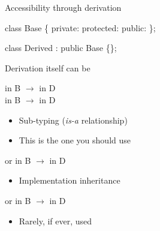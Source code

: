 \begin{frame}[fragile]{Accessibility through derivation}

  \begin{codeblock}{
class Base \{
 private:
  \ddd
 protected:
  \ddd
 public:
  \ddd
\};

class Derived : \alert{public} Base \{\};
}\end{codeblock}

  Derivation itself can be
  \begin{description}
    \item []  in B $\rightarrow$  in D\\
       in B $\rightarrow$  in D
      \begin{itemize}
      \item Sub-typing (\textit{is-a} relationship)
      \item This is the one you should use
      \end{itemize}
    \item<2-> [\code{private}]  or  in B
      $\rightarrow$  in D
      \begin{itemize}
      \item Implementation inheritance
      \end{itemize}
    \item<3-> [\code{protected}]  or  in B
      $\rightarrow$  in D
      \begin{itemize}
      \item Rarely, if ever, used
      \end{itemize}
  \end{description}
\end{frame}


